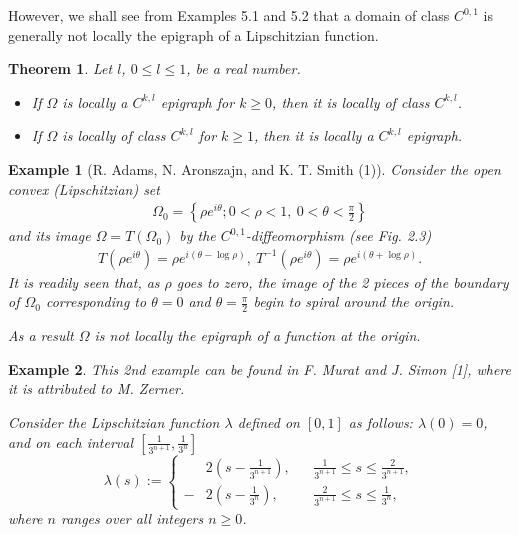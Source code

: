 \documentclass{book}
\numberwithin{equation}{section}
\newtheorem{theorem}{Theorem}[section]
\newtheorem{example}{Example}[section]
\begin{document}
\begin{enumerate}
    However, we shall see from Examples 5.1 and 5.2 that a domain of class $C^{0,1}$ is generally not locally the epigraph of a Lipschitzian function.
    
    \begin{theorem}
        Let $l$, $0\le l\le 1$, be a real number.
        \begin{itemize}
            \item[(i)] If $\Omega$ is locally a $C^{k,l}$ epigraph for $k\ge 0$, then it is locally of class $C^{k,l}$.
            \item[(ii)] If $\Omega$ is locally of class $C^{k,l}$ for $k\ge 1$, then it is locally a $C^{k,l}$ epigraph.
        \end{itemize}
    \end{theorem}
    
    \begin{example}[R. Adams, N. Aronszajn, and K. T. Smith (1)]
        Consider the open convex (Lipschitzian) set
        \begin{align*}
            \Omega_0 = \left\{\rho e^{i\theta};0 < \rho < 1,\ 0 < \theta < \frac{\pi}{2}\right\}
        \end{align*}
        and its image $\Omega = T(\Omega_0)$ by the $C^{0,1}$-diffeomorphism (see Fig. 2.3)
        \begin{align*}
            T\left(\rho e^{i\theta}\right) = \rho e^{i\left(\theta - \log\rho\right)},\ T^{-1}\left(\rho e^{i\theta}\right) = \rho e^{i\left(\theta + \log\rho\right)}.
        \end{align*}
        It is readily seen that, as $\rho$ goes to zero, the image of the 2 pieces of the boundary of $\Omega_0$ corresponding to $\theta = 0$ and $\theta = \frac{\pi}{2}$ begin to spiral around the origin.
        
        As a result $\Omega$ is not locally the epigraph of a function at the origin.
    \end{example}
    
    \begin{example}
        This 2nd example can be found in F. Murat and J. Simon [1], where it is attributed to M. Zerner.
        
        Consider the Lipschitzian function $\lambda$ defined on $[0,1]$ as follows: $\lambda(0) = 0$, and on each interval $\left[\frac{1}{3^{n+1}},\frac{1}{3^n}\right]$
        \begin{equation*}
            \lambda(s) := \left\{\begin{split}
                &2\left(s - \frac{1}{3^{n+1}}\right), &&\frac{1}{3^{n+1}}\le s\le\frac{2}{3^{n+1}},\\
                -&2\left(s - \frac{1}{3^n}\right), &&\frac{2}{3^{n+1}}\le s\le\frac{1}{3^n},
            \end{split}\right.
        \end{equation*}
        where $n$ ranges over all integers $n\ge 0$.
        

\end{example}
\end{enumerate}
\end{document}
